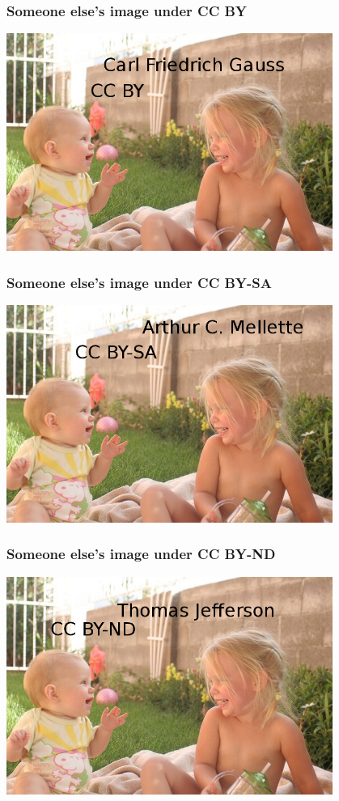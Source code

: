 \documentclass[mathserif,xcolor=dvipsnames,hyperref={bookmarks=true}]{beamer}
\begin{document}
\begin{frame}[t]
    \frametitle{Someone else's image under CC BY}
    \begin{center}
        \includegraphics[width=0.8\textwidth]{../images/others/cc-by.jpg}
    \end{center}
\end{frame}
\begin{frame}[t]
    \frametitle{Someone else's image under CC BY-SA}
    \begin{center}
        \includegraphics[width=0.8\textwidth]{../images/others/cc-by-sa.jpg}
    \end{center}
\end{frame}
\begin{frame}[t]
    \frametitle{Someone else's image under CC BY-ND}
    \begin{center}
        \includegraphics[width=0.8\textwidth]{../images/others/cc-by-nd.jpg}
    \end{center}
\end{frame}
\end{document}
